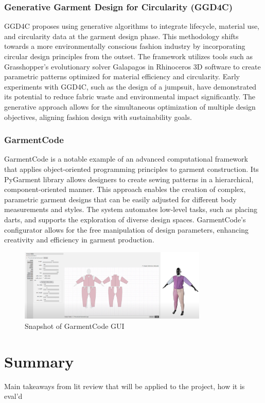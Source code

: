 \subsubsection{Generative Garment Design for Circularity (GGD4C)}
GGD4C proposes using generative algorithms to integrate lifecycle, material use, and circularity data at the garment design phase. This methodology shifts towards a more environmentally conscious fashion industry by incorporating circular design principles from the outset. The framework utilizes tools such as Grasshopper’s evolutionary solver Galapagos in Rhinoceros 3D software to create parametric patterns optimized for material efficiency and circularity. Early experiments with GGD4C, such as the design of a jumpsuit, have demonstrated its potential to reduce fabric waste and environmental impact significantly. The generative approach allows for the simultaneous optimization of multiple design objectives, aligning fashion design with sustainability goals.

\subsubsection{GarmentCode}
GarmentCode is a notable example of an advanced computational framework that applies object-oriented programming principles to garment construction. Its PyGarment library allows designers to create sewing patterns in a hierarchical, component-oriented manner. This approach enables the creation of complex, parametric garment designs that can be easily adjusted for different body measurements and styles. The system automates low-level tasks, such as placing darts, and supports the exploration of diverse design spaces. GarmentCode's configurator allows for the free manipulation of design parameters, enhancing creativity and efficiency in garment production.
\begin{figure} [H]
    \centering
    \includegraphics[width=0.8\textwidth]{Images/pygarment.png}
    \caption{Snapshot of GarmentCode GUI}
\end{figure}

\section{Summary}
Main takeaways from lit review that will be applied to the project, how it is eval'd